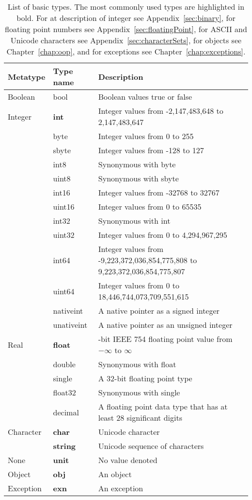 \begin{table}
  \centering
  \begin{tabularx}{\textwidth}{|l|l|>{\raggedright\arraybackslash}X|}
    \hline
    Metatype & Type name & Description\\
    \hline
    Boolean & bool & Boolean values true or false \\
    \hline
    Integer & \textbf{int} & Integer values from -2,147,483,648 to 2,147,483,647 \\
             & byte &Integer values from 0 to 255\\
             & sbyte &Integer values from -128 to 127\\
             & int8 &Synonymous with byte\\
             & uint8 &Synonymous with sbyte\\
             & int16 &Integer values from -32768 to 32767\\
             & uint16 &Integer values from 0 to 65535\\
             & int32 &Synonymous with int\\
             & uint32 & Integer values from 0 to 4,294,967,295\\
             & int64 &Integer values from -9,223,372,036,854,775,808 to 9,223,372,036,854,775,807\\
             & uint64 &Integer values from 0 to 18,446,744,073,709,551,615\\
             & nativeint &A native pointer as a signed integer\\
             & unativeint &A native pointer as an unsigned integer\\
    \hline
    Real &\textbf{float} & 64-bit IEEE 754 floating point value from $-\infty$ to $\infty$\\
             & double & Synonymous with float\\
             & single &A 32-bit floating point type\\
             & float32 &Synonymous with single\\
             & decimal &A floating point data type that has at least 28 significant digits\\
    \hline
    Character &\textbf{char} &Unicode character\\
             &\textbf{string} & Unicode sequence of characters\\
    \hline
    None &\textbf{unit} & No value denoted\\
    \hline
    Object &\textbf{obj} & An object\\
    \hline
    Exception &\textbf{exn} & An exception\\
    \hline
  \end{tabularx}
  \caption{List of basic types. The most commonly used types are highlighted in bold. For at description of integer see Appendix~\ref{sec:binary}, for floating point numbers see Appendix~\ref{sec:floatingPoint}, for ASCII and Unicode characters see Appendix~\ref{sec:characterSets}, for objects see Chapter~\ref{chap:oop}, and for exceptions see Chapter~\ref{chap:exceptions}.}
  \label{tab:primitiveTypes}
\end{table}
